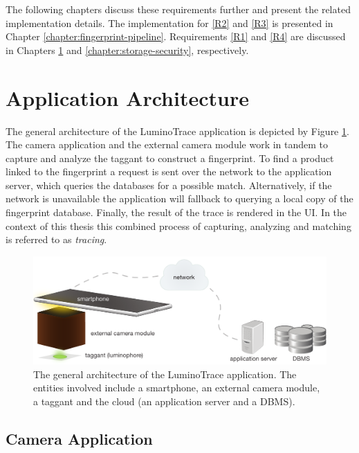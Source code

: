 \documentclass[thesis.tex]{subfiles}
\begin{document}
\noindent The following chapters discuss these requirements further and present the related implementation details. The implementation for \ref{R2} and \ref{R3} is presented in Chapter \ref{chapter:fingerprint-pipeline}. Requirements \ref{R1} and \ref{R4} are discussed in Chapters \ref{chapter:application-architecture} and \ref{chapter:storage-security}, respectively.

\section{Application Architecture}
\label{chapter:application-architecture}

The general architecture of the LuminoTrace application is depicted by Figure \ref{figure:architecture}. The camera application and the external camera module work in tandem to capture and analyze the taggant to construct a fingerprint. To find a product linked to the fingerprint a request is sent over the network to the application server, which queries the databases for a possible match. Alternatively, if the network is unavailable the application will fallback to querying a local copy of the fingerprint database. Finally, the result of the trace is rendered in the UI. In the context of this thesis this combined process of capturing, analyzing and matching is referred to as \emph{tracing}.

\clearpage

\begin{figure}[h]
\centering \includegraphics[width=13.5cm]{images/design_implementation/architecture.pdf}
\caption{The general architecture of the LuminoTrace application. The entities involved include a smartphone, an external camera module, a taggant and the cloud (an application server and a DBMS). \label{figure:architecture}}
\end{figure}

\subsection{Camera Application}
\label{chapter:camera-application}
\end{document}
